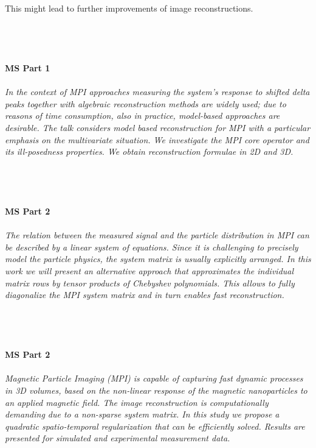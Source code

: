 \begin{multicols}{2}
{This might lead to further improvements of image reconstructions.}\\
\\ 
    \\
    \\\\
    \noindent\textbf{MS Part 1}\\
\\  
    \textit{In the context of MPI approaches measuring the system's response to shifted delta peaks 
together with algebraic reconstruction methods are widely used;
due to reasons of time consumption, also in practice, model-based approaches are desirable.
The talk considers model based reconstruction for MPI with 
a particular emphasis on the multivariate situation. 
We investigate the MPI core operator and its ill-posedness properties.
We obtain reconstruction formulae in 2D and 3D.  }\\
\\ 
    \\
    \\\\
    \noindent\textbf{MS Part 2}\\
\\  
    \textit{The relation between the measured signal and the particle distribution in MPI can be described by a linear system of equations. Since it is challenging to precisely model the particle physics, the system matrix is usually explicitly arranged. In this work we will present an alternative approach that approximates the individual matrix rows by tensor products of Chebyshev polynomials. This allows to fully diagonalize the MPI system matrix and in turn enables fast reconstruction.}\\
\\ 
    \\
    \\\\
    \noindent\textbf{MS Part 2}\\
\\  
    \textit{Magnetic Particle Imaging (MPI) is capable of capturing fast dynamic processes in 3D volumes, based on the non-linear response of the magnetic nanoparticles to an applied magnetic field. The image reconstruction is computationally demanding due to a non-sparse system matrix. In this study we propose a quadratic spatio-temporal regularization that can be efficiently solved. Results are presented for simulated and experimental measurement data.}\\

\end{multicols}

